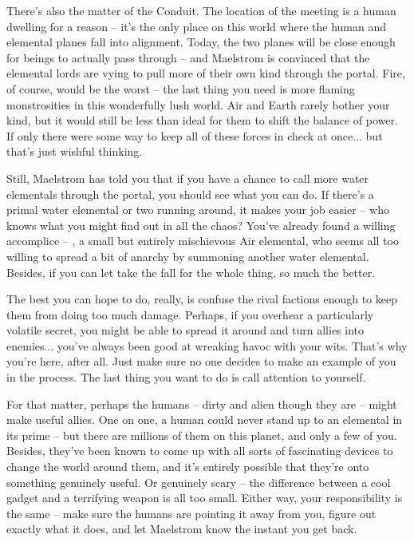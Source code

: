 \documentclass[char]{elementals}
\begin{document}
There's also the matter of the Conduit. The location of the meeting is a human dwelling for a reason -- it's the only place on this world where the human and elemental planes fall into alignment. Today, the two planes will be close enough for beings to actually pass through -- and Maelstrom is convinced that the elemental lords are vying to pull more of their own kind through the portal. Fire, of course, would be the worst -- the last thing you need is more flaming monstrosities in this wonderfully lush world. Air and Earth rarely bother your kind, but it would still be less than ideal for them to shift the balance of power. If only there were some way to keep all of these forces in check at once... but that's just wishful thinking. 

Still, Maelstrom has told you that if you have a chance to call more water elementals through the portal, you should see what you can do. If there's a primal water elemental or two running around, it makes your job easier -- who knows what you might find out in all the chaos? You've already found a willing accomplice -- \cMiniAir{\intro}, a small but entirely mischievous Air elemental, who seems all too willing to spread a bit of anarchy by summoning another water elemental. Besides, if you can let \cMiniAir{\them} take the fall for the whole thing, so much the better.

The best you can hope to do, really, is confuse the rival factions enough to keep them from doing too much damage. Perhaps, if you overhear a particularly volatile secret, you might be able to spread it around and turn allies into enemies... you've always been good at wreaking havoc with your wits. That's why you're here, after all. Just make sure no one decides to make an example of you in the process. The last thing you want to do is call attention to yourself.

For that matter, perhaps the humans -- dirty and alien though they are -- might make useful allies. One on one, a human could never stand up to an elemental in its prime -- but there are millions of them on this planet, and only a few of you. Besides, they've been known to come up with all sorts of fascinating devices to change the world around them, and it's entirely possible that they're onto something genuinely useful. Or genuinely scary -- the difference between a cool gadget and a terrifying weapon is all too small. Either way, your responsibility is the same -- make sure the humans are pointing it away from you, figure out exactly what it does, and let Maelstrom know the instant you get back.
\end{document}
